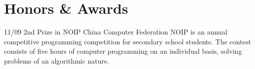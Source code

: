 \documentclass[a4paper]{friggeri-cv}
\begin{document}
\section{Honors \& Awards}
\begin{entrylist}
  \entry
    {11/09}
    {2nd Prize in NOIP}
    {China Computer Federation}
    {NOIP is an annual competitive programming competition for secondary school students.  The contest consists of five hours of computer programming on an individual basis, solving problems of an algorithmic nature.}
\end{entrylist}

\end{document}
